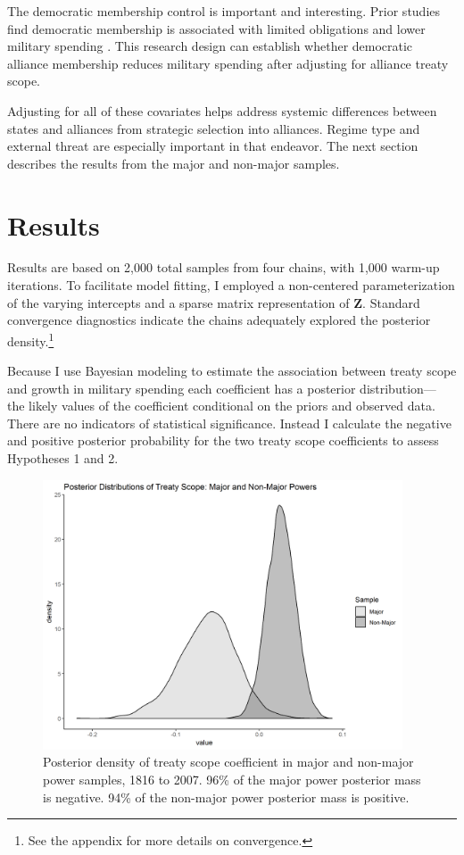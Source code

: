 \documentclass[12pt]{article}
\begin{document}
The democratic membership control is important and interesting. 
Prior studies find democratic membership is associated with limited obligations \citep{Chibaetal2015} and lower military spending \citep{DigiuseppePoast2016}.
This research design can establish whether democratic alliance membership reduces military spending after adjusting for alliance treaty scope. 


Adjusting for all of these covariates helps address systemic differences between states and alliances from strategic selection into alliances. 
Regime type and external threat are especially important in that endeavor. 
The next section describes the results from the major and non-major samples.
 

\section{Results}


Results are based on 2,000 total samples from four chains, with 1,000 warm-up iterations. 
To facilitate model fitting, I employed a non-centered parameterization of the varying intercepts and a sparse matrix representation of \textbf{Z}. 
Standard convergence diagnostics indicate the chains adequately explored the posterior density.\footnote{See the appendix for more details on convergence.} 


Because I use Bayesian modeling to estimate the association between treaty scope and growth in military spending each coefficient has a posterior distribution--- the likely values of the coefficient conditional on the priors and observed data.
There are no indicators of statistical significance. 
Instead I calculate the negative and positive posterior probability for the two treaty scope coefficients to assess Hypotheses 1 and 2.


\begin{figure}[htbp]
	\centering
		\includegraphics[width=0.95\textwidth]{../figures/scope-dens.png}
	\caption{Posterior density of treaty scope coefficient in major and non-major power samples, 1816 to 2007. 96\% of the major power posterior mass is negative. 94\% of the non-major power posterior mass is positive.}
	\label{fig:str-dens}
\end{figure}
\end{document}
